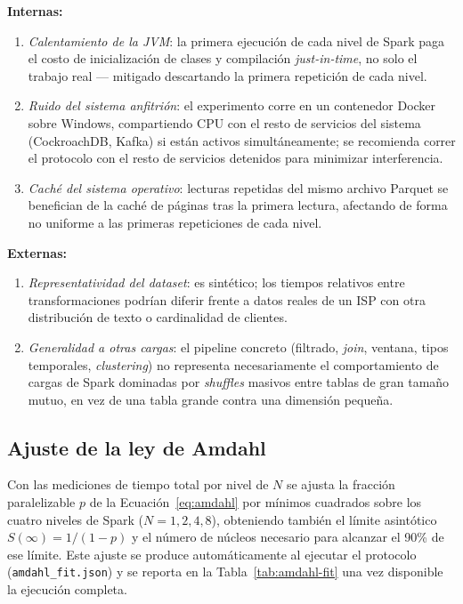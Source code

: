 \documentclass[11pt,letterpaper]{article}
\begin{document}
\textbf{Internas:}
\begin{enumerate}[leftmargin=1.5em]
    \item \emph{Calentamiento de la JVM}: la primera ejecución de cada nivel de Spark paga el
        costo de inicialización de clases y compilación \emph{just-in-time}, no solo el trabajo
        real — mitigado descartando la primera repetición de cada nivel.
    \item \emph{Ruido del sistema anfitrión}: el experimento corre en un contenedor Docker sobre
        Windows, compartiendo CPU con el resto de servicios del sistema (CockroachDB, Kafka) si
        están activos simultáneamente; se recomienda correr el protocolo con el resto de servicios
        detenidos para minimizar interferencia.
    \item \emph{Caché del sistema operativo}: lecturas repetidas del mismo archivo Parquet se
        benefician de la caché de páginas tras la primera lectura, afectando de forma no uniforme
        a las primeras repeticiones de cada nivel.
\end{enumerate}

\textbf{Externas:}
\begin{enumerate}[leftmargin=1.5em]
    \item \emph{Representatividad del dataset}: es sintético; los tiempos relativos entre
        transformaciones podrían diferir frente a datos reales de un ISP con otra distribución de
        texto o cardinalidad de clientes.
    \item \emph{Generalidad a otras cargas}: el pipeline concreto (filtrado, \emph{join}, ventana,
        tipos temporales, \emph{clustering}) no representa necesariamente el comportamiento de
        cargas de Spark dominadas por \emph{shuffles} masivos entre tablas de gran tamaño mutuo,
        en vez de una tabla grande contra una dimensión pequeña.
\end{enumerate}

\subsection{Ajuste de la ley de Amdahl}

Con las mediciones de tiempo total por nivel de $N$ se ajusta la fracción paralelizable $p$ de la
Ecuación~\ref{eq:amdahl} por mínimos cuadrados sobre los cuatro niveles de Spark ($N=1,2,4,8$),
obteniendo también el límite asintótico $S(\infty) = 1/(1-p)$ y el número de núcleos necesario
para alcanzar el 90\% de ese límite. Este ajuste se produce automáticamente al ejecutar el
protocolo (\texttt{amdahl\_fit.json}) y se reporta en la Tabla~\ref{tab:amdahl-fit} una vez
disponible la ejecución completa.
\end{document}
